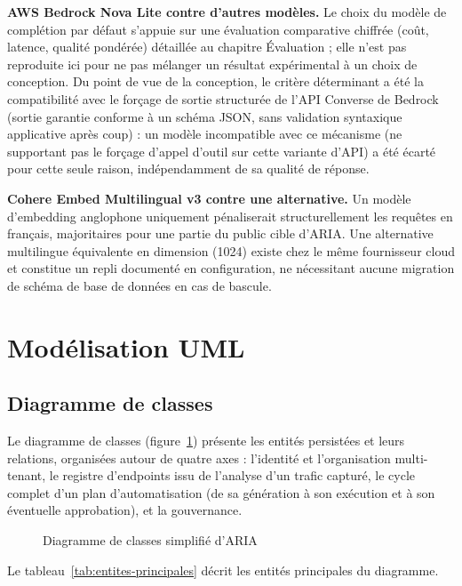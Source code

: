 \textbf{AWS Bedrock Nova Lite contre d'autres modèles.} Le choix du modèle de complétion par défaut s'appuie sur une évaluation comparative chiffrée (coût, latence, qualité pondérée) détaillée au chapitre Évaluation ; elle n'est pas reproduite ici pour ne pas mélanger un résultat expérimental à un choix de conception. Du point de vue de la conception, le critère déterminant a été la compatibilité avec le forçage de sortie structurée de l'API Converse de Bedrock (sortie garantie conforme à un schéma JSON, sans validation syntaxique applicative après coup) : un modèle incompatible avec ce mécanisme (ne supportant pas le forçage d'appel d'outil sur cette variante d'API) a été écarté pour cette seule raison, indépendamment de sa qualité de réponse.

\textbf{Cohere Embed Multilingual v3 contre une alternative.} Un modèle d'embedding anglophone uniquement pénaliserait structurellement les requêtes en français, majoritaires pour une partie du public cible d'ARIA. Une alternative multilingue équivalente en dimension (1024) existe chez le même fournisseur cloud et constitue un repli documenté en configuration, ne nécessitant aucune migration de schéma de base de données en cas de bascule.

\section{Modélisation UML}
\label{sec:uml}

\subsection{Diagramme de classes}

Le diagramme de classes (figure~\ref{fig:diagramme-classes}) présente les entités persistées et leurs relations, organisées autour de quatre axes : l'identité et l'organisation multi-tenant, le registre d'endpoints issu de l'analyse d'un trafic capturé, le cycle complet d'un plan d'automatisation (de sa génération à son exécution et à son éventuelle approbation), et la gouvernance.

\begin{figure}[H]
  \centering
  \caption{Diagramme de classes simplifié d'ARIA}
  \label{fig:diagramme-classes}
\end{figure}

Le tableau~\ref{tab:entites-principales} décrit les entités principales du diagramme.

